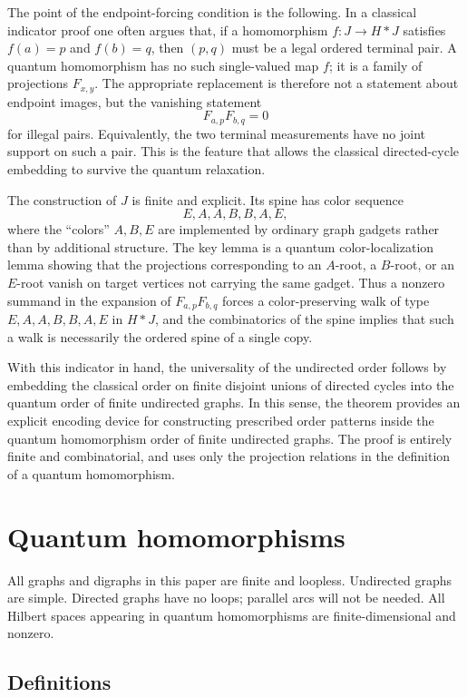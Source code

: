 \documentclass[11pt]{amsart}
\theoremstyle{plain}
\theoremstyle{definition}
\begin{document}
The point of the endpoint-forcing condition is the following.  In a classical indicator proof one often argues that, if a homomorphism $f:J\to H*J$ satisfies $f(a)=p$ and $f(b)=q$, then $(p,q)$ must be a legal ordered terminal pair.  A quantum homomorphism has no such single-valued map $f$; it is a family of projections $F_{x,y}$.  The appropriate replacement is therefore not a statement about endpoint images, but the vanishing statement
\[
   F_{a,p}F_{b,q}=0
\]
for illegal pairs.  Equivalently, the two terminal measurements have no joint support on such a pair.  This is the feature that allows the classical directed-cycle embedding to survive the quantum relaxation.

The construction of $J$ is finite and explicit.  Its spine has color sequence
\[
   E,A,A,B,B,A,E,
\]
where the ``colors'' $A,B,E$ are implemented by ordinary graph gadgets rather than by additional structure.  The key lemma is a quantum color-localization lemma showing that the projections corresponding to an $A$-root, a $B$-root, or an $E$-root vanish on target vertices not carrying the same gadget.  Thus a nonzero summand in the expansion of $F_{a,p}F_{b,q}$ forces a color-preserving walk of type $E,A,A,B,B,A,E$ in $H*J$, and the combinatorics of the spine implies that such a walk is necessarily the ordered spine of a single copy.

With this indicator in hand, the universality of the undirected order follows by embedding the classical order on finite disjoint unions of directed cycles into the quantum order of finite undirected graphs.  In this sense, the theorem provides an explicit encoding device for constructing prescribed order patterns inside the quantum homomorphism order of finite undirected graphs.  The proof is entirely finite and combinatorial, and uses only the projection relations in the definition of a quantum homomorphism.

\section{Quantum homomorphisms}

All graphs and digraphs in this paper are finite and loopless.  Undirected graphs are simple.  Directed graphs have no loops; parallel arcs will not be needed.  All Hilbert spaces appearing in quantum homomorphisms are finite-dimensional and nonzero.

\subsection{Definitions}
\end{document}
